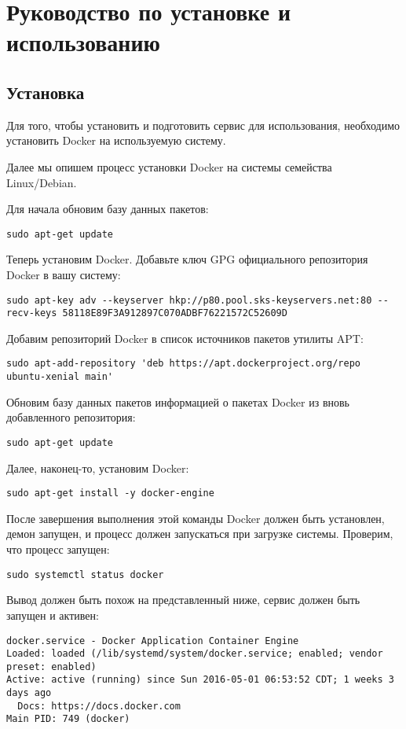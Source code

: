 \section{Руководство по установке и использованию}
\label{sec:manual}

\subsection{Установка}
\label{sec:manual:install}

Для того, чтобы установить и подготовить сервис для использования, необходимо установить Docker на используемую систему.

Далее мы опишем процесс установки Docker на системы семейства \\Linux/Debian.

Для начала обновим базу данных пакетов:
\begin{lstlisting}
sudo apt-get update
\end{lstlisting}

Теперь установим Docker. Добавьте ключ GPG официального репозитория Docker в вашу систему:
\begin{lstlisting}
sudo apt-key adv --keyserver hkp://p80.pool.sks-keyservers.net:80 --recv-keys 58118E89F3A912897C070ADBF76221572C52609D
\end{lstlisting}

Добавим репозиторий Docker в список источников пакетов утилиты APT:
\begin{lstlisting}
sudo apt-add-repository 'deb https://apt.dockerproject.org/repo ubuntu-xenial main'
\end{lstlisting}

Обновим базу данных пакетов информацией о пакетах Docker из вновь добавленного репозитория:
\begin{lstlisting}
sudo apt-get update
\end{lstlisting}

Далее, наконец-то, установим Docker:
\begin{lstlisting}
sudo apt-get install -y docker-engine
\end{lstlisting}

После завершения выполнения этой команды Docker должен быть установлен, демон запущен, и процесс должен запускаться при загрузке системы. Проверим, что процесс запущен:
\begin{lstlisting}
sudo systemctl status docker
\end{lstlisting}

Вывод должен быть похож на представленный ниже, сервис должен быть запущен и активен:
\begin{lstlisting}
docker.service - Docker Application Container Engine
Loaded: loaded (/lib/systemd/system/docker.service; enabled; vendor preset: enabled)
Active: active (running) since Sun 2016-05-01 06:53:52 CDT; 1 weeks 3 days ago
  Docs: https://docs.docker.com
Main PID: 749 (docker)
\end{lstlisting}

